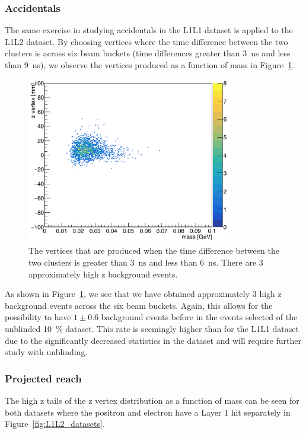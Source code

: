 \documentclass[twoside]{article}
\begin{document}
\subsubsection{Accidentals}

The same exercise in studying accidentals in the L1L1 dataset is applied to the L1L2 dataset. By choosing vertices where the time difference between the two clusters is across six beam buckets (time differences greater than 3~ns and less than 9~ns), we observe the vertices produced as a function of mass in Figure~\ref{fig:zVmAcc_l1l2}.

\begin{figure}[H]
  \centering
      \includegraphics[width=0.8\textwidth]{plots/zVm_acc_L1L2.png}
  \caption{The vertices that are produced when the time difference between the two clusters is greater than 3~ns and less than 6~ns. There are 3 approximately high z background events.}
  \label{fig:zVmAcc_l1l2}
\end{figure} 

As shown in Figure~\ref{fig:zVmAcc_l1l2}, we see that we have obtained approximately 3 high z background events across the six beam buckets. Again, this allows for the possibility to have $1\pm0.6$ background events before in the events selected of the unblinded 10~$\%$ dataset. This rate is seemingly higher than for the L1L1 dataset due to the significantly decreased statistics in the dataset and will require further study with unblinding. 


\subsubsection{Projected reach}

The high z tails of the z vertex distribution as a function of mass can be seen for both datasets where the positron and electron have a Layer 1 hit separately in Figure~\ref{fig:L1L2_datasets}.
\end{document}

